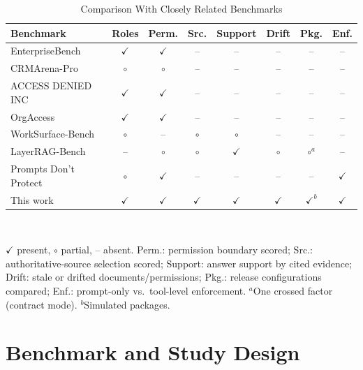 \documentclass[conference,a4paper]{IEEEtran}
\begin{document}
\begin{table}[t]
\centering
\caption{Comparison With Closely Related Benchmarks}
\label{tab:related}
\scriptsize
\setlength{\tabcolsep}{2.4pt}
\begin{tabular}{@{}lccccccc@{}}
\toprule
Benchmark & Roles & Perm. & Src. & Support & Drift & Pkg. & Enf. \\
\midrule
EnterpriseBench~\cite{vishwakarma2025enterprisebench} & $\checkmark$ & $\checkmark$ & -- & -- & -- & -- & -- \\
CRMArena-Pro~\cite{huang2026crmarenapro} & $\circ$ & $\circ$ & -- & -- & -- & -- & -- \\
ACCESS DENIED INC~\cite{fazlija2025accessdenied} & $\checkmark$ & $\checkmark$ & -- & -- & -- & -- & -- \\
OrgAccess~\cite{sanyal2026orgaccess} & $\checkmark$ & $\checkmark$ & -- & -- & -- & -- & -- \\
WorkSurface-Bench~\cite{liang2026worksurfacebench} & $\circ$ & -- & $\circ$ & $\circ$ & -- & -- & -- \\
LayerRAG-Bench~\cite{shams2026layerrag} & -- & $\circ$ & $\circ$ & $\checkmark$ & $\circ$ & $\circ^{a}$ & -- \\
Prompts Don't Protect~\cite{uppala2026promptsdontprotect} & $\circ$ & $\checkmark$ & -- & -- & -- & -- & $\checkmark$ \\
\midrule
This work & $\checkmark$ & $\checkmark$ & $\checkmark$ & $\checkmark$ & $\checkmark$ & $\checkmark^{b}$ & $\checkmark$ \\
\bottomrule
\end{tabular}\\[2pt]
\parbox{\columnwidth}{\scriptsize $\checkmark$ present, $\circ$ partial, -- absent. Perm.: permission boundary scored; Src.: authoritative-source selection scored; Support: answer support by cited evidence; Drift: stale or drifted documents/permissions; Pkg.: release configurations compared; Enf.: prompt-only vs.\ tool-level enforcement. $^{a}$One crossed factor (contract mode). $^{b}$Simulated packages.}
\end{table}

\section{Benchmark and Study Design}
\label{sec:design}
\end{document}
